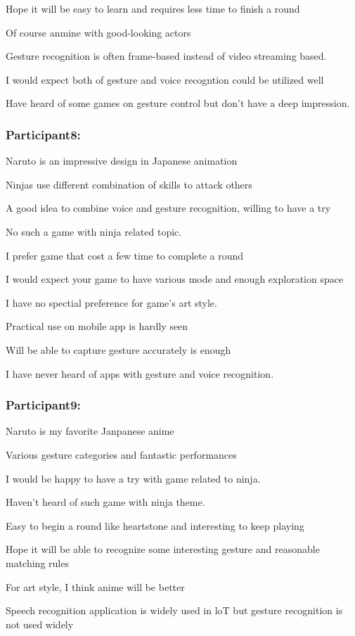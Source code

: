 \documentclass[UTF8,a4paper,12pt]{ctexart}
\numberwithin{equation}{section}
\begin{document}
Hope it will be easy to learn and requires less time to finish a round

Of course anmine with good-looking actors

Gesture recognition is often frame-based instead of video streaming based.

I would expect both of gesture and voice recogntion could be utilized well

Have heard of some games on gesture control but don't have a deep impression.

\subsubsection*{Participant8:}
Naruto is an impressive design in Japanese animation

Ninjas use different combination of skills to attack others

A good idea to combine voice and gesture recognition, willing to have a try

No such a game with ninja related topic.

I prefer game that cost a few time to complete a round

I would expect your game to have various mode and enough exploration space

I have no spectial preference for game's art style.

Practical use on mobile app is hardly seen

Will be able to capture gesture accurately is enough

I have never heard of apps with gesture and voice recognition.

\subsubsection*{Participant9:}
Naruto is my favorite Janpanese anime

Various gesture categories and fantastic performances

I would be happy to have a try with game related to ninja.

Haven't heard of such game with ninja theme.

Easy to begin a round like heartstone and interesting to keep playing

Hope it will be able to recognize some interesting gesture and reasonable matching rules

For art style, I think anime will be better

Speech recognition application is widely used in loT but gesture recognition is not used widely
\end{document}
